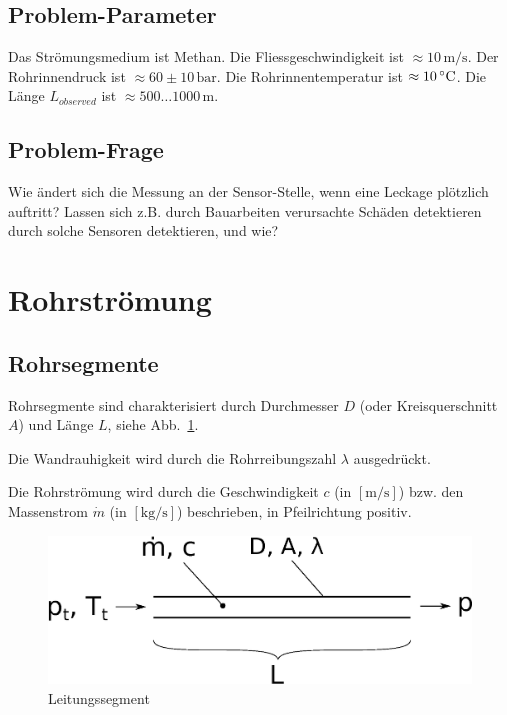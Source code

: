\documentclass[a4paper,10pt,twocolumn]{article}
\begin{document}
\subsection{Problem-Parameter}

Das Strömungsmedium ist Methan. Die Fliessgeschwindigkeit ist $\approx 10\,\mathrm{m/s}$. Der Rohrinnendruck ist $\approx 60\pm 10\,\mathrm{bar}$. Die Rohrinnentemperatur ist $\approx 10\,\mathrm{\degree C}$. Die Länge $L_\mathit{observed}$ ist $\approx 500 \ldots 1000 \,\mathrm{m}$.

\subsection{Problem-Frage}

Wie ändert sich die Messung an der Sensor-Stelle, wenn eine Leckage plötzlich auftritt? Lassen sich z.B. durch Bauarbeiten verursachte Schäden detektieren durch solche Sensoren detektieren, und wie?



\appendix

\section{Rohrströmung}

\subsection{Rohrsegmente}

Rohrsegmente sind charakterisiert durch Durchmesser $D$ (oder Kreisquerschnitt $A$) und Länge $L$, siehe Abb.~\ref{fig:leitungssegment}.

Die Wandrauhigkeit wird durch die Rohrreibungszahl $\lambda$ ausgedrückt.

Die Rohrströmung wird durch die Geschwindigkeit $c$ (in $\mathrm{[m/s]}$) bzw. den Massenstrom $\dot m$ (in $\mathrm{[kg/s]}$) beschrieben, in Pfeilrichtung positiv.

\begin{figure}[hbp]
\centering
\includegraphics[width=0.9\hsize]{problem.eps}
\caption{Leitungssegment}
\label{fig:leitungssegment}
\end{figure}
\end{document}
